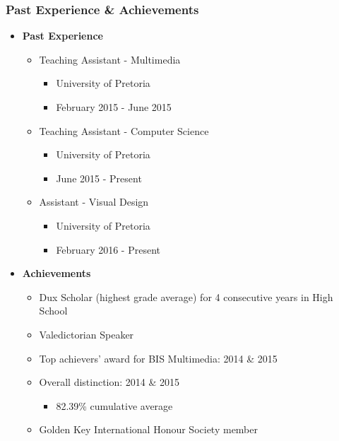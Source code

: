 \documentclass{article}
\begin{document}
	\subsubsection{Past Experience \& Achievements}
		\begin{itemize}
			\item \textbf{Past Experience}
			\begin{itemize}
				\item Teaching Assistant - Multimedia
				\begin{itemize}
					\item University of Pretoria
					\item February 2015 - June 2015
				\end{itemize}
				\item Teaching Assistant - Computer Science
				\begin{itemize}
					\item University of Pretoria
					\item June 2015 - Present
				\end{itemize}
				\item Assistant - Visual Design
				\begin{itemize}
					\item University of Pretoria
					\item February 2016 - Present
				\end{itemize}
			\end{itemize}
			\item \textbf{Achievements}
				\begin{itemize}
					\item Dux Scholar (highest grade average) for 4 consecutive years in High School
					\item Valedictorian Speaker
					\item Top achievers' award for BIS Multimedia: 2014 \& 2015
					\item Overall distinction: 2014 \& 2015
					\begin{itemize}
						\item 82.39\% cumulative average
					\end{itemize}
					\item Golden Key International Honour Society member
				\end{itemize}
		\end{itemize}
\end{document}
